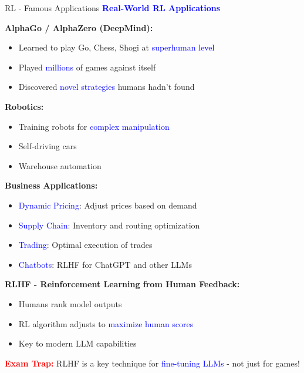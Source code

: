 \documentclass[8pt]{beamer}
\begin{document}
	\begin{frame}{RL - Famous Applications}
		\fontsize{6.5}{7.5}\selectfont
		\textcolor{blue}{\textbf{Real-World RL Applications}}
		
		\textbf{AlphaGo / AlphaZero (DeepMind):}
		\begin{itemize}
			\item Learned to play Go, Chess, Shogi at \textcolor{blue}{superhuman level}
			\item Played \textcolor{blue}{millions} of games against itself
			\item Discovered \textcolor{blue}{novel strategies} humans hadn't found
		\end{itemize}
		
		\textbf{Robotics:}
		\begin{itemize}
			\item Training robots for \textcolor{blue}{complex manipulation}
			\item Self-driving cars
			\item Warehouse automation
		\end{itemize}
		
		\textbf{Business Applications:}
		\begin{itemize}
			\item \textcolor{blue}{Dynamic Pricing}: Adjust prices based on demand
			\item \textcolor{blue}{Supply Chain}: Inventory and routing optimization
			\item \textcolor{blue}{Trading}: Optimal execution of trades
			\item \textcolor{blue}{Chatbots}: RLHF for ChatGPT and other LLMs
		\end{itemize}
		
		\textbf{RLHF - Reinforcement Learning from Human Feedback:}
		\begin{itemize}
			\item Humans rank model outputs
			\item RL algorithm adjusts to \textcolor{blue}{maximize human scores}
			\item Key to modern LLM capabilities
		\end{itemize}
		
		\textcolor{red}{\textbf{Exam Trap:}} RLHF is a key technique for \textcolor{blue}{fine-tuning LLMs} - not just for games!
	\end{frame}
	
	
\end{document}
